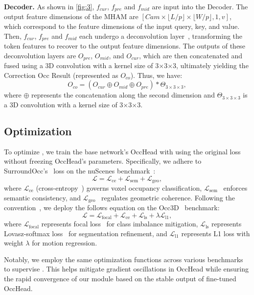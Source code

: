 \noindent\textbf{Decoder.} As shown in \cref{fig:3}, $f_{cur}$, $f_{pre}$ and $f_{mid}$ are input into the Decoder. The output feature dimensions of the MHAM are $[Cam \times \lfloor L/p \rfloor \times \lfloor W/p \rfloor, 1, v]$, which correspond to the feature dimensions of the input query, key, and value. Then, $f_{cur}$, $f_{pre}$ and $f_{mid}$ each undergo a deconvolution layer~\cite{Deconvolutional2010}, transforming the token features to recover to the output feature dimensions. The outputs of these deconvolution layers are $O_{pre}$, $O_{mid}$, and $O_{cur}$, which are then concatenated and fused using a 3D convolution with a kernel size of 3$\times$3$\times$3, ultimately yielding the Correction Occ Result (represented as $O_{co}$). Thus, we have:
\begin{equation}
O_{co} = (O_{cur} \oplus O_{mid}\oplus O_{pre})\ast \Theta_{3\times3\times3},
\label{eq:fusion}
\end{equation}
where $\oplus$ represents the concatenation along the second dimension and $\Theta_{3\times3\times3}$ is a 3D convolution with a kernel size of 3$\times$3$\times$3.

\subsection{Optimization}

To optimize \ours, we train the base network's OccHead with \ours using the original loss without freezing OccHead's parameters. Specifically, we adhere to SurroundOcc's~\cite{surroundOcc} loss on the nuScenes benchmark~\cite{nuScenes}: 
\begin{equation}
\mathcal{L} = \mathcal{L}_{\text{ce}} + \mathcal{L}_{\text{sem}} + \mathcal{L}_{\text{geo}},
\end{equation}
where $\mathcal{L}_{\text{ce}}$ (cross-entropy~\cite{cross_entropy_loss_2}) governs voxel occupancy classification, $\mathcal{L}_{\text{sem}}$~\cite{Semantic_loss} enforces semantic consistency, and $\mathcal{L}_{\text{geo}}$~\cite{geometry_affinity_loss} regulates geometric coherence. 
Following the convention~\cite{viewformer}, we deploy the follows equation on the Occ3D~\cite{Occ3D} benchmark: 
\begin{equation}
\mathcal{L} = \mathcal{L}_{\text{focal}} + \mathcal{L}_{\text{ce}} + \mathcal{L}_{\text{ls}} + \lambda\mathcal{L}_{\text{l1}},
\end{equation}
where $\mathcal{L}_{\text{focal}}$ represents focal loss~\cite{focal_loss} for class imbalance mitigation, $\mathcal{L}_{\text{ls}}$ represents Lovasz-softmax loss~\cite{lovasz_loss} for segmentation refinement, and $\mathcal{L}_{\text{l1}}$ represents L1 loss with weight $\lambda$ for motion regression.

Notably, we employ the same optimization functions across various benchmarks to supervise \ours. This helps mitigate gradient oscillations in OccHead while ensuring the rapid convergence of our module based on the stable output of fine-tuned OccHead.